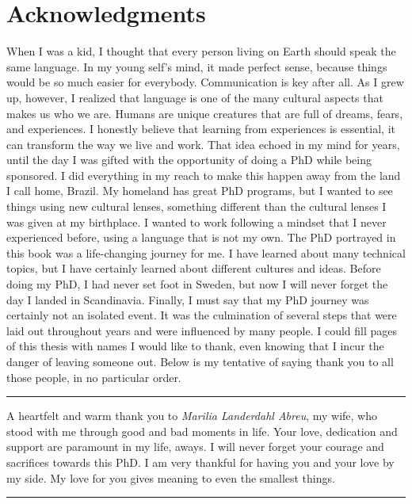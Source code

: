 \chapter*{Acknowledgments}

When I was a kid, I thought that every person living on Earth should speak the same language. In my young self's mind, it made perfect sense, because things would be so much easier for everybody. Communication is key after all. As I grew up, however, I realized that language is one of the many cultural aspects that makes us who we are. Humans are unique creatures that are full of dreams, fears, and experiences. I honestly believe that learning from experiences is essential, it can transform the way we live and work. That idea echoed in my mind for years, until the day I was gifted with the opportunity of doing a PhD while being sponsored. I did everything in my reach to make this happen away from the land I call home, Brazil. My homeland has great PhD programs, but I wanted to see things using new cultural lenses, something different than the cultural lenses I was given at my birthplace. I wanted to work following a mindset that I never experienced before, using a language that is not my own. The PhD portrayed in this book was a life-changing journey for me. I have learned about many technical topics, but I have certainly learned about different cultures and ideas. Before doing my PhD, I had never set foot in Sweden, but now I will never forget the day I landed in Scandinavia. Finally, I must say that my PhD journey was certainly not an isolated event. It was the culmination of several steps that were laid out throughout years and were influenced by many people. I could fill pages of this thesis with names I would like to thank, even knowing that I incur the danger of leaving someone out. Below is my tentative of saying thank you to all those people, in no particular order.

\vspace{7pt}\hrule\vspace{5pt}

A heartfelt and warm thank you to \textit{Marilia Landerdahl Abreu}, my wife, who stood with me through good and bad moments in life. Your love, dedication and support are paramount in my life, aways. I will never forget your courage and sacrifices towards this PhD. I am very thankful for having you and your love by my side. My love for you gives meaning to even the smallest things.

\vspace{7pt}\hrule\vspace{5pt}


